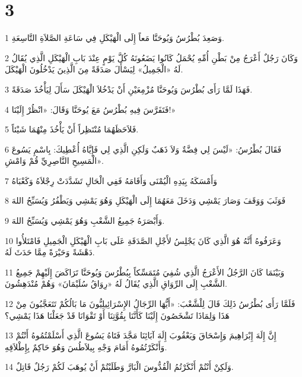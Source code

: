 \chapter{3}

\par 1 وَصَعِدَ بُطْرُسُ وَيُوحَنَّا مَعاً إِلَى الْهَيْكَلِ فِي سَاعَةِ الصَّلاَةِ التَّاسِعَةِ.
\par 2 وَكَانَ رَجُلٌ أَعْرَجُ مِنْ بَطْنِ أُمِّهِ يُحْمَلُ كَانُوا يَضَعُونَهُ كُلَّ يَوْمٍ عِنْدَ بَابِ الْهَيْكَلِ الَّذِي يُقَالُ لَهُ «الْجَمِيلُ» لِيَسْأَلَ صَدَقَةً مِنَ الَّذِينَ يَدْخُلُونَ الْهَيْكَلَ.
\par 3 فَهَذَا لَمَّا رَأَى بُطْرُسَ وَيُوحَنَّا مُزْمِعَيْنِ أَنْ يَدْخُلاَ الْهَيْكَلَ سَأَلَ لِيَأْخُذَ صَدَقَةً.
\par 4 فَتَفَرَّسَ فِيهِ بُطْرُسُ مَعَ يُوحَنَّا وَقَالَ: «انْظُرْ إِلَيْنَا!»
\par 5 فَلاَحَظَهُمَا مُنْتَظِراً أَنْ يَأْخُذَ مِنْهُمَا شَيْئاً.
\par 6 فَقَالَ بُطْرُسُ: «لَيْسَ لِي فِضَّةٌ وَلاَ ذَهَبٌ وَلَكِنِ الَّذِي لِي فَإِيَّاهُ أُعْطِيكَ: بِاسْمِ يَسُوعَ الْمَسِيحِ النَّاصِرِيِّ قُمْ وَامْشِ».
\par 7 وَأَمْسَكَهُ بِيَدِهِ الْيُمْنَى وَأَقَامَهُ فَفِي الْحَالِ تَشَدَّدَتْ رِجْلاَهُ وَكَعْبَاهُ
\par 8 فَوَثَبَ وَوَقَفَ وَصَارَ يَمْشِي وَدَخَلَ مَعَهُمَا إِلَى الْهَيْكَلِ وَهُوَ يَمْشِي وَيَطْفُرُ وَيُسَبِّحُ اللهَ
\par 9 وَأَبْصَرَهُ جَمِيعُ الشَّعْبِ وَهُوَ يَمْشِي وَيُسَبِّحُ اللهَ.
\par 10 وَعَرَفُوهُ أَنَّهُ هُوَ الَّذِي كَانَ يَجْلِسُ لأَجْلِ الصَّدَقَةِ عَلَى بَابِ الْهَيْكَلِ الْجَمِيلِ فَامْتَلأُوا دَهْشَةً وَحَيْرَةً مِمَّا حَدَثَ لَهُ.
\par 11 وَبَيْنَمَا كَانَ الرَّجُلُ الأَعْرَجُ الَّذِي شُفِيَ مُتَمَسِّكاً بِبُطْرُسَ وَيُوحَنَّا تَرَاكَضَ إِلَيْهِمْ جَمِيعُ الشَّعْبِ إِلَى الرِّوَاقِ الَّذِي يُقَالُ لَهُ «رِوَاقُ سُلَيْمَانَ» وَهُمْ مُنْدَهِشُونَ.
\par 12 فَلَمَّا رَأَى بُطْرُسُ ذَلِكَ قَالَ لِلْشَّعْبَ: «أَيُّهَا الرِّجَالُ الإِسْرَائِيلِيُّونَ مَا بَالُكُمْ تَتَعَجَّبُونَ مِنْ هَذَا وَلِمَاذَا تَشْخَصُونَ إِلَيْنَا كَأَنَّنَا بِقُوَّتِنَا أَوْ تَقْوَانَا قَدْ جَعَلْنَا هَذَا يَمْشِي؟
\par 13 إِنَّ إِلَهَ إِبْرَاهِيمَ وَإِسْحَاقَ وَيَعْقُوبَ إِلَهَ آبَائِنَا مَجَّدَ فَتَاهُ يَسُوعَ الَّذِي أَسْلَمْتُمُوهُ أَنْتُمْ وَأَنْكَرْتُمُوهُ أَمَامَ وَجْهِ بِيلاَطُسَ وَهُوَ حَاكِمٌ بِإِطْلاَقِهِ.
\par 14 وَلَكِنْ أَنْتُمْ أَنْكَرْتُمُ الْقُدُّوسَ الْبَارَّ وَطَلَبْتُمْ أَنْ يُوهَبَ لَكُمْ رَجُلٌ قَاتِلٌ.
